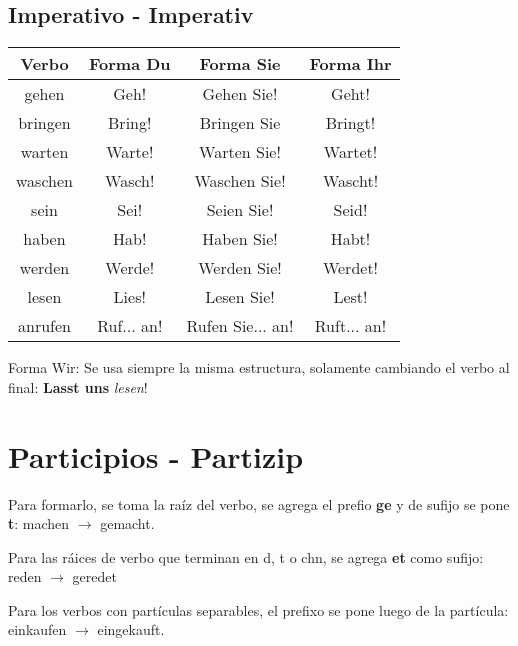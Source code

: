 \subsection{Imperativo - Imperativ}
\begin{tabular}{|c | c c c |}
\hline
\textbf{Verbo} & \textbf{Forma Du} & \textbf{Forma Sie} & \textbf{Forma Ihr}\\
\hline
gehen 	& Geh! 		 & Gehen Sie! 		& Geht! \\
bringen & Bring! 	 & Bringen Sie 		& Bringt! \\
warten 	& Warte! 	 & Warten Sie! 		& Wartet! \\
waschen & Wasch! 	 & Waschen Sie! 	& Wascht! \\
sein 	& Sei! 		 & Seien Sie! 		& Seid! \\
haben 	& Hab! 		 & Haben Sie! 		& Habt! \\
werden 	& Werde! 	 & Werden Sie! 		& Werdet! \\
lesen 	& Lies! 	 & Lesen Sie! 		& Lest! \\
anrufen & Ruf... an! & Rufen Sie... an! & Ruft... an!\\
\hline
\end{tabular}

Forma Wir: Se usa siempre la misma estructura, solamente cambiando el verbo al final: \textbf{Lasst uns} \textit{lesen}!

\section{Participios - Partizip}
Para formarlo, se toma la raíz del verbo, se agrega el prefio \textbf{ge} y de sufijo se pone \textbf{t}: machen $\rightarrow$ gemacht.

Para las ráices de verbo que terminan en d, t o chn, se agrega \textbf{et} como sufijo: reden $\rightarrow$ geredet

Para los verbos con partículas separables, el prefixo se pone luego de la partícula: einkaufen $\rightarrow$ eingekauft.

